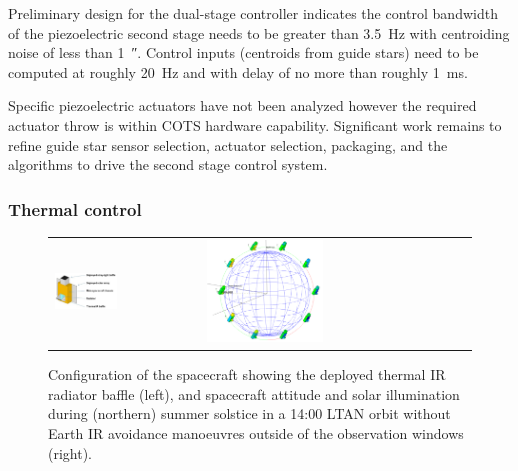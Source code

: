 \documentclass[]{iac}
\begin{document}
Preliminary design for the dual-stage controller indicates the control bandwidth of the piezoelectric second stage needs
to be greater than \SI{3.5}{\hertz} with centroiding noise of less than \SI{1}{\arcsecond}. Control inputs (centroids
from guide stars) need to be computed at roughly \SI{20}{\hertz} and with delay of no more than roughly
\SI{1}{\milli\second}.

Specific piezoelectric actuators have not been analyzed however the required actuator throw is within COTS hardware
capability. Significant work remains to refine guide star sensor selection, actuator selection, packaging, and the
algorithms to drive the second stage control system.

\subsubsection{Thermal control}
\label{sec:thermal}

\begin{figure}[tbp]
  \begin{center}
    \begin{tabular}{m{} m{}}
      \includegraphics[width=0.45\textwidth]{figures/radiator.png} & \includegraphics[width=0.45\textwidth]{figures/orbit.png}
    \end{tabular}
  \end{center}
  \caption{\label{fig:thermalpics}Configuration of the spacecraft showing the deployed thermal IR radiator baffle
    (left), and spacecraft attitude and solar illumination during (northern) summer solstice in a 14:00 LTAN orbit
    without Earth IR avoidance manoeuvres outside of the observation windows (right).}
\end{figure}
\end{document}
